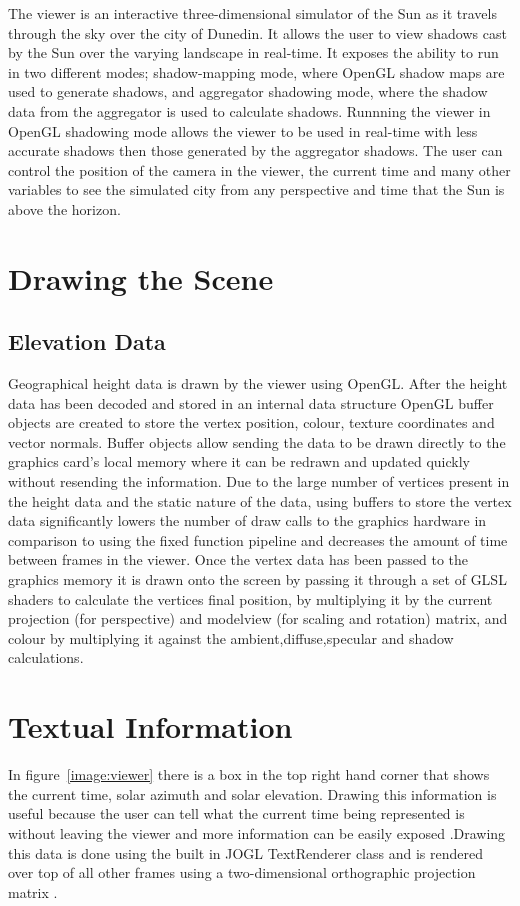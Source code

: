 \documentclass[12pt]{report}
\begin{document}
The viewer is an interactive three-dimensional simulator of the Sun as it travels through the sky over the city of Dunedin. It allows the user to view shadows cast by the Sun over the varying landscape in real-time. It exposes the ability to run in two different modes; shadow-mapping mode, where OpenGL shadow maps are used to generate shadows, and aggregator shadowing mode, where the shadow data from the aggregator is used to calculate shadows. Runnning the viewer in OpenGL shadowing mode allows the viewer to be used in real-time with less accurate shadows then those generated by the aggregator shadows. The user can control the position of the camera in the viewer, the current time and many other variables to see the simulated city from any perspective and time that the Sun is above the horizon.

\section{Drawing the Scene}

\subsection{Elevation Data}
Geographical height data is drawn by the viewer using OpenGL. After the height data has been decoded and stored in an internal data structure OpenGL buffer objects are created to store the vertex position, colour, texture coordinates and vector normals. Buffer objects allow sending the data to be drawn directly to the graphics card's local memory where it can be redrawn and updated quickly without resending the information. Due to the large number of vertices present in the height data and the static nature of the data, using buffers to store the vertex data significantly lowers the number of draw calls to the graphics hardware in comparison to using the fixed function pipeline and decreases the amount of time between frames in the viewer. Once the vertex data has been passed to the graphics memory it is drawn onto the screen by passing it through a set of GLSL shaders to calculate the vertices final position, by multiplying it by the current projection (for perspective) and modelview (for scaling and rotation) matrix, and colour by multiplying it against the ambient,diffuse,specular and shadow calculations. 


\section{Textual Information}
In figure~\ref{image:viewer} there is a box in the top right hand corner that shows the current time, solar azimuth and solar elevation. Drawing this information is useful because the user can tell what the current time being represented is without leaving the viewer and more information can be easily exposed .Drawing this data is done using the built in JOGL TextRenderer class and is rendered over top of all other frames using a two-dimensional orthographic projection matrix .
\end{document}
